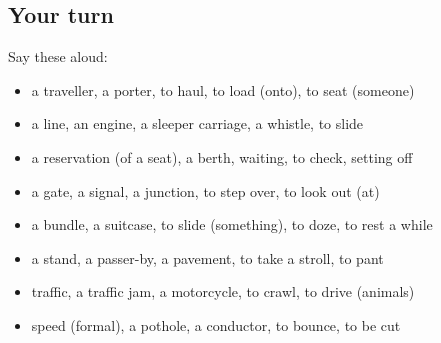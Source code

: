 \subsection*{Your turn}
Say these aloud:

\begin{itemize}
\raggedright
  \item a traveller, a porter, to haul, to load (onto), to seat (someone)
  \item a line, an engine, a sleeper carriage, a whistle, to slide
  \item a reservation (of a seat), a berth, waiting, to check, setting off
  \item a gate, a signal, a junction, to step over, to look out (at)
  \item a bundle, a suitcase, to slide (something), to doze, to rest a while
  \item a stand, a passer-by, a pavement, to take a stroll, to pant
  \item traffic, a traffic jam, a motorcycle, to crawl, to drive (animals)
  \item speed (formal), a pothole, a conductor, to bounce, to be cut
\end{itemize}

